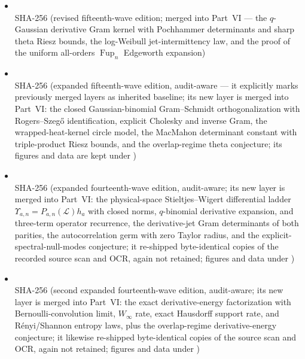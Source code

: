 \documentclass[11pt,oneside]{article}
\numberwithin{equation}{section}
\theoremstyle{definition}
\theoremstyle{remark}
\begin{document}
\begin{itemize}
\item {} \\ {\footnotesize SHA-256 } (revised fifteenth-wave edition; merged into Part~VI --- the $q$-Gaussian derivative Gram kernel with Pochhammer determinants and sharp theta Riesz bounds, the log-Weibull jet-intermittency law, and the proof of the uniform all-orders $\operatorname{Fup}_n$ Edgeworth expansion)
\item {} \\ {\footnotesize SHA-256 } (expanded fifteenth-wave edition, audit-aware --- it explicitly marks previously merged layers as inherited baseline; its new layer is merged into Part~VI: the closed Gaussian-binomial Gram--Schmidt orthogonalization with Rogers--Szeg\H{o} identification, explicit Cholesky and inverse Gram, the wrapped-heat-kernel circle model, the MacMahon determinant constant with triple-product Riesz bounds, and the overlap-regime theta conjecture; its figures and data are kept under )
\item {} \\ {\footnotesize SHA-256 } (expanded fourteenth-wave edition, audit-aware; its new layer is merged into Part~VI: the physical-space Stieltjes--Wigert differential ladder $\Upsilon_{a,n}=P_{a,n}(\mathcal L)h_a$ with closed norms, $q$-binomial derivative expansion, and three-term operator recurrence, the derivative-jet Gram determinants of both parities, the autocorrelation germ with zero Taylor radius, and the explicit-spectral-null-modes conjecture; it re-shipped byte-identical copies of the recorded source scan and OCR, again not retained; figures and data under )
\item {} \\ {\footnotesize SHA-256 } (second expanded fourteenth-wave edition, audit-aware; its new layer is merged into Part~VI: the exact derivative-energy factorization with Bernoulli-convolution limit, $W_\infty$ rate, exact Hausdorff support rate, and R\'enyi/Shannon entropy laws, plus the overlap-regime derivative-energy conjecture; it likewise re-shipped byte-identical copies of the source scan and OCR, again not retained; figures and data under )

\end{itemize}
\end{document}
